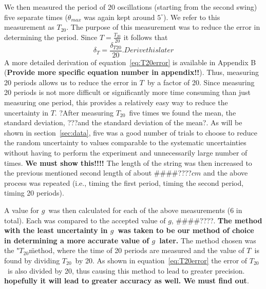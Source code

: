 \documentclass[iop,numberedappendix,appendixfloats]{emulateapj}
\def\g{$g$}
\def\T{$T$}
\def\Ttwen{$T_{20}$}
\def\fillin{\#\#\#\#????}
\def\deg{^{\circ}}
\begin{document}
We then measured the period of 20 oscillations (starting from the second 
swing) five separate times ($\theta_{max}$ was again kept around $5\deg$). 
We refer to this measurement as $T_{20}$. The purpose of this 
measurement was to reduce the error in determining the period.  Since 
$T=\frac{T_{20}}{20}$ it follows that
\begin{equation}
\label{eq:T20error}
\delta_T = \frac{\delta_{T20}}{20}.  Derive this later
\end{equation}
A more detailed derivation of equation~\ref{eq:T20error} is available in 
Appendix B ({\bf Provide more specific equation number in appendix!!}).
Thus, measuring 20 periods allows us to reduce the error in \T\ by a factor of 
20.  Since measuring 20 periods is not more difficult or significantly more 
time consuming than just measuring one period, this provides a relatively easy 
way to reduce the uncertainty in \T.  ?After measuring \Ttwen\ five times we 
found the mean, the standard deviation, ???and the standard deviation of the 
mean?.  As will be shown in section~\ref{sec:data}, five was a good number of trials to 
choose to reduce the random uncertainty to values comparable to the systematic 
uncertainties without having to perform the experiment and unnecessarily large 
number of times. {\bf We must show this!!!!}  The length of the string was 
then increased to the previous mentioned second length of 
about \fillin $cm$ and the above process was repeated (i.e., 
timing the first period, timing the second period, timing 20 periods).

A value for \g\ was then calculated for each of the above measurements (6 in 
total). Each was compared to the accepted value of \g, \fillin.  {\bf The 
method with the least uncertainty in \g\ was taken to be our method of choice 
in determining a more accurate value of \g\ later.}  The method chosen was the 
"\Ttwen\" method, where the time of 20 periods are measured and the value of 
\T\ is found by dividing \Ttwen\ by 20.  As shown in 
equation~\ref{eq:T20error} the error of \Ttwen\ is also divided by 20, thus 
causing this method to lead to greater precision.  {\bf hopefully it will lead 
to greater accuracy as well.  We must find out}. 
\end{document}
